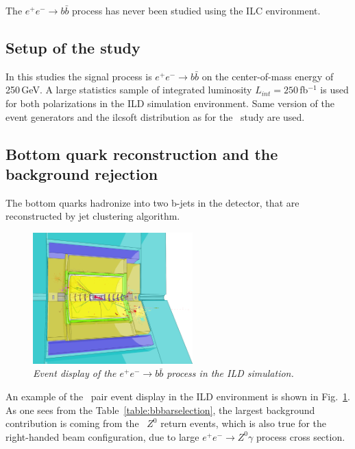 The $e^+e^-\to b\bar{b}$ process has never been studied using the ILC environment. 
\subsection{Setup of the study}
In this studies the signal process is $e^+e^-\to b\bar{b}$ on the center-of-mass energy of 250\,GeV. 
A large statistics sample of integrated luminosity $L_{int}= 250$\,fb{$^{-1}$} is used for both polarizations in the ILD simulation environment. 
Same version of the event generators and the {\sc ilcsoft} distribution as for the \ttbar\ study are used.


\subsection{Bottom quark reconstruction and the background rejection}
The bottom quarks hadronize into two b-jets in the detector, that are reconstructed by jet clustering algorithm. %
\begin{figure}
	{\centering
		\includegraphics[clip, trim=0.cm 0cm 7.9cm 0cm, width=0.55\textwidth]{ILD/graphics/ild-bbbar.png}
		\caption{\sl Event display of the $e^+e^-\to b\bar{b}$ process in the ILD simulation.
		}
		\label{fig:BottomEvent_3}
	}
	
\end{figure}
An example of the \bbbar\ pair event display in the ILD environment is shown in Fig.~\ref{fig:BottomEvent_3}. As one sees from the Table~\ref{table:bbbarselection}, the largest background contribution is coming from the \bbbar\ $Z^0$ return events, which is also true for the right-handed beam configuration, due to large $e^+e^-\to Z^0\gamma$ process cross section.


